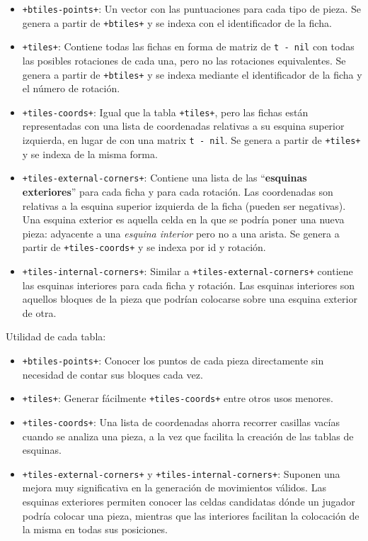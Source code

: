 \begin{itemize}
	\item \texttt{+btiles-points+}: Un vector con las puntuaciones para cada
		tipo de pieza. Se genera a partir de \texttt{+btiles+} y se
		indexa con el identificador de la ficha.

	\item \texttt{+tiles+}: Contiene todas las fichas en forma de matriz de
		\texttt{t - nil} con todas las posibles rotaciones de cada una,
		pero no las rotaciones equivalentes. Se genera a partir de
		\texttt{+btiles+} y se indexa mediante el identificador de la
		ficha y el número de rotación.

	\item \texttt{+tiles-coords+}: Igual que la tabla \texttt{+tiles+}, pero
		las fichas están representadas con una lista de coordenadas
		relativas a su esquina superior izquierda, en lugar de con una
		matrix \texttt{t - nil}. Se genera a partir de \texttt{+tiles+}
		y se indexa de la misma forma.

	\item \texttt{+tiles-external-corners+}: Contiene una lista de las
		``\textbf{esquinas exteriores}'' para cada ficha y para cada
		rotación. Las coordenadas son relativas a la esquina superior
		izquierda de la ficha (pueden ser negativas). Una esquina
		exterior es aquella celda en la que se podría poner una nueva
		pieza: adyacente a una \textsl{esquina interior} pero no a una
		arista. Se genera a partir de \texttt{+tiles-coords+} y se
		indexa por id y rotación.

	\item \texttt{+tiles-internal-corners+}: Similar a
		\texttt{+tiles-external-corners+} contiene las esquinas
		interiores para cada ficha y rotación. Las esquinas interiores
		son aquellos bloques de la pieza que podrían colocarse sobre una
		esquina exterior de otra.
\end{itemize}

Utilidad de cada tabla:
\begin{itemize}
	\item \texttt{+btiles-points+}: Conocer los puntos de cada pieza
		directamente sin necesidad de contar sus bloques cada vez.

	\item \texttt{+tiles+}: Generar fácilmente \texttt{+tiles-coords+}
		entre otros usos menores.

	\item \texttt{+tiles-coords+}: Una lista de coordenadas ahorra
		recorrer casillas vacías cuando se analiza una pieza, a la vez
		que facilita la creación de las tablas de esquinas.

	\item \texttt{+tiles-external-corners+} y
		\texttt{+tiles-internal-corners+}: Suponen una mejora muy
		significativa en la generación de movimientos válidos. Las
		esquinas exteriores permiten conocer las celdas candidatas dónde
		un jugador podría colocar una pieza, mientras que las interiores
		facilitan la colocación de la misma en todas sus posiciones.
\end{itemize}

